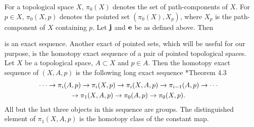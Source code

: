 \documentclass[11pt,twoside]{article}
\begin{document}
For a topological space \(X\), \(\pi_0(X)\) denotes the set of path-components of \(X\). For \(p\in X\), \(\pi_0(X,p)\) denotes the pointed set $(\pi_0(X),X_p)$, where \(X_p\) is the path-component of \(X\) containing \(p\). Let \(\mathbf{j}\) and \(\mathbf{e}\) be as defined above. Then 
\begin{center}
\end{center}
is an exact sequence. Another exact \seq of pointed sets, which will be useful for our purpose, is the homotopy exact sequence of a pair of pointed topological spaces. Let \(X\) be a topological space, \(A\subset X\) and \(p\in A\). Then the homotopy exact sequence of \((X,A,p)\) is the following long exact sequence \cite{Hat}*{Theorem 4.3}
\begin{multline}
\cdots \rightarrow \pi_i(A,p) \rightarrow \pi_i(X,p) \rightarrow \pi_i(X,A,p) \rightarrow \pi_{i-1}(A,p) \rightarrow \cdots\\ \rightarrow \pi_1(X,A,p) \rightarrow \pi_{0}(A,p) \rightarrow \pi_0(X,p).	
\end{multline}
All but the last three objects in this sequence are groups. The distinguished element of \(\pi_1(X,A,p)\) is the homotopy class of the constant map.
\end{document}
